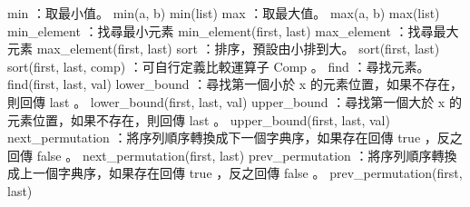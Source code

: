 min ：取最小值。
min(a, b)
min(list)
max ：取最大值。
max(a, b)
max(list)
min_element ：找尋最小元素
min_element(first, last)
max_element ：找尋最大元素
max_element(first, last)
sort ：排序，預設由小排到大。
sort(first, last)
sort(first, last, comp) ：可自行定義比較運算子 Comp 。
find ：尋找元素。
find(first, last, val)
lower_bound ：尋找第一個小於 x 的元素位置，如果不存在，則回傳 last 。
lower_bound(first, last, val)
upper_bound ：尋找第一個大於 x 的元素位置，如果不存在，則回傳 last 。
upper_bound(first, last, val)
next_permutation ：將序列順序轉換成下一個字典序，如果存在回傳 true ，反之回傳 false 。
next_permutation(first, last)
prev_permutation ：將序列順序轉換成上一個字典序，如果存在回傳 true ，反之回傳 false 。
prev_permutation(first, last)